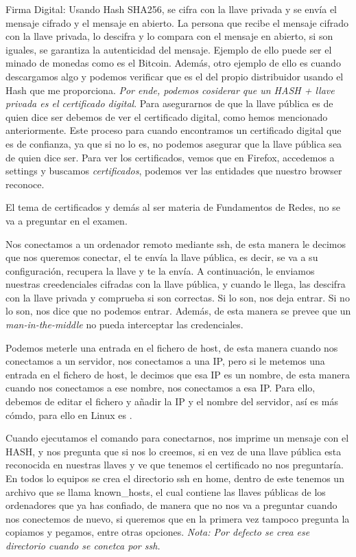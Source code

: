Firma Digital: Usando Hash SHA256, se cifra con la llave privada y se envía el mensaje cifrado y el mensaje en abierto. La persona que recibe el mensaje cifrado con la llave privada, lo descifra y lo compara con el mensaje en abierto, si son iguales, se garantiza la autenticidad del mensaje. Ejemplo de ello puede ser el minado de monedas como es el Bitcoin. Además, otro ejemplo de ello es cuando descargamos algo y podemos verificar que es el del propio distribuidor usando el Hash que me proporciona. \textit{Por ende, podemos cosiderar que un HASH + llave privada es el certificado digital}. Para asegurarnos de que la llave pública es de quien dice ser debemos de ver el certificado digital, como hemos mencionado anteriormente. Este proceso para cuando encontramos un certificado digital que es de confianza, ya que si no lo es, no podemos asegurar que la llave pública sea de quien dice ser. Para ver los certificados, vemos que en Firefox, accedemos a settings y buscamos \textit{certificados}, podemos ver las entidades que nuestro browser reconoce.

\begin{tcolorbox}[colback=yellow!10!white, colframe=red!75!black, title=Advertencia]
El tema de certificados y demás al ser materia de Fundamentos de Redes, no se va a preguntar en el examen.
\end{tcolorbox}

Nos conectamos a un ordenador remoto mediante ssh, de esta manera le decimos que nos queremos conectar, el te envía la llave pública, es decir, se va a su configuración, recupera la llave y te la envía. A continuación, le enviamos nuestras creedenciales cifradas con la llave pública, y cuando le llega, las descifra con la llave privada y comprueba si son correctas. Si lo son, nos deja entrar. Si no lo son, nos dice que no podemos entrar. Además, de esta manera se prevee que un \textit{man-in-the-middle} no pueda interceptar las credenciales.

Podemos meterle una entrada en el fichero de host, de esta manera cuando nos conectamos a un servidor, nos conectamos a una IP, pero si le metemos una entrada en el fichero de host, le decimos que esa IP es un nombre, de esta manera cuando nos conectamos a ese nombre, nos conectamos a esa IP. Para ello, debemos de editar el fichero  y añadir la IP y el nombre del servidor, así es más cómdo, para ello en Linux es . 

Cuando ejecutamos el comando para conectarnos, nos imprime un mensaje con el HASH, y nos pregunta que si nos lo creemos, si en vez de una llave pública esta reconocida en nuestras llaves y ve que tenemos el certificado no nos preguntaría. En todos lo equipos se crea el directorio ssh en home, dentro de este tenemos un archivo que se llama known\_hosts, el cual contiene las llaves públicas de los ordenadores que ya has confiado, de manera que no nos va a preguntar cuando nos conectemos de nuevo, si queremos que en la primera vez tampoco pregunta la copiamos y pegamos, entre otras opciones. \textit{Nota: Por defecto se crea ese directorio cuando se conetca por ssh.}

